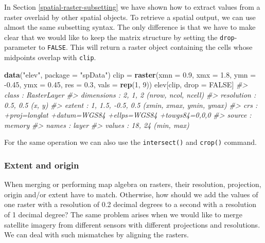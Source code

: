 \documentclass[]{krantz}
\newenvironment{Shaded}{\begin{snugshade}}{\end{snugshade}}
\newcommand{\CommentTok}[1]{\textcolor[rgb]{0.37,0.37,0.37}{\textit{#1}}}
\newcommand{\DataTypeTok}[1]{\textcolor[rgb]{0.27,0.27,0.27}{#1}}
\newcommand{\DecValTok}[1]{\textcolor[rgb]{0.06,0.06,0.06}{#1}}
\newcommand{\FloatTok}[1]{\textcolor[rgb]{0.06,0.06,0.06}{#1}}
\newcommand{\KeywordTok}[1]{\textcolor[rgb]{0.27,0.27,0.27}{\textbf{#1}}}
\newcommand{\NormalTok}[1]{#1}
\newcommand{\OtherTok}[1]{\textcolor[rgb]{0.37,0.37,0.37}{#1}}
\newcommand{\StringTok}[1]{\textcolor[rgb]{0.5,0.5,0.5}{#1}}
\begin{document}
In Section \ref{spatial-raster-subsetting} we have shown how to extract values from a raster overlaid by other spatial objects.
To retrieve a spatial output, we can use almost the same subsetting syntax.
The only difference is that we have to make clear that we would like to keep the matrix structure by setting the \texttt{drop}-parameter to \texttt{FALSE}.
This will return a raster object containing the cells whose midpoints overlap with \texttt{clip}.

\begin{Shaded}
\begin{Highlighting}[]
\KeywordTok{data}\NormalTok{(}\StringTok{"elev"}\NormalTok{, }\DataTypeTok{package =} \StringTok{"spData"}\NormalTok{)}
\NormalTok{clip =}\StringTok{ }\KeywordTok{raster}\NormalTok{(}\DataTypeTok{xmn =} \FloatTok{0.9}\NormalTok{, }\DataTypeTok{xmx =} \FloatTok{1.8}\NormalTok{, }\DataTypeTok{ymn =} \FloatTok{-0.45}\NormalTok{, }\DataTypeTok{ymx =} \FloatTok{0.45}\NormalTok{,}
              \DataTypeTok{res =} \FloatTok{0.3}\NormalTok{, }\DataTypeTok{vals =} \KeywordTok{rep}\NormalTok{(}\DecValTok{1}\NormalTok{, }\DecValTok{9}\NormalTok{))}
\NormalTok{elev[clip, drop =}\StringTok{ }\OtherTok{FALSE}\NormalTok{]}
\CommentTok{#> class      : RasterLayer }
\CommentTok{#> dimensions : 2, 1, 2  (nrow, ncol, ncell)}
\CommentTok{#> resolution : 0.5, 0.5  (x, y)}
\CommentTok{#> extent     : 1, 1.5, -0.5, 0.5  (xmin, xmax, ymin, ymax)}
\CommentTok{#> crs        : +proj=longlat +datum=WGS84 +ellps=WGS84 +towgs84=0,0,0 }
\CommentTok{#> source     : memory}
\CommentTok{#> names      : layer }
\CommentTok{#> values     : 18, 24  (min, max)}
\end{Highlighting}
\end{Shaded}

For the same operation we can also use the \texttt{intersect()} and \texttt{crop()} command.

\hypertarget{extent-and-origin}{%
\subsubsection{Extent and origin}\label{extent-and-origin}}

When merging or performing map algebra on rasters, their resolution, projection, origin and/or extent have to match. Otherwise, how should we add the values of one raster with a resolution of 0.2 decimal degrees to a second with a resolution of 1 decimal degree?
The same problem arises when we would like to merge satellite imagery from different sensors with different projections and resolutions.
We can deal with such mismatches by aligning the rasters.
\end{document}
